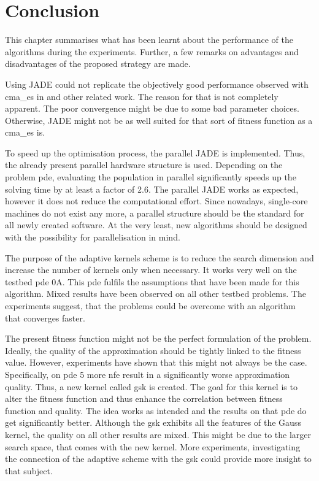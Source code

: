 \documentclass[./\jobname.tex]{subfiles}
\begin{document}
\chapter{Conclusion}
This chapter summarises what has been learnt about the performance of the algorithms during the experiments. Further, a few remarks on advantages and disadvantages of the proposed strategy are made. 

Using JADE could not replicate the objectively good performance observed with \gls{cma_es} in \cite{chaquet_using_2019} and other related work. The reason for that is not completely apparent. The poor convergence might be due to some bad parameter choices. Otherwise, JADE might not be as well suited for that sort of fitness function as a \gls{cma_es} is. 

To speed up the optimisation process, the parallel JADE is implemented. Thus, the already present parallel hardware structure is used. Depending on the problem \gls{pde}, evaluating the population in parallel significantly speeds up the solving time by at least a factor of 2.6. The parallel JADE works as expected, however it does not reduce the computational effort. Since nowadays, single-core machines do not exist any more, a parallel structure should be the standard for all newly created software. At the very least, new algorithms should be designed with the possibility for parallelisation in mind. 

The purpose of the adaptive kernels scheme is to reduce the search dimension and increase the number of kernels only when necessary. It works very well on the testbed \gls{pde} 0A. This \gls{pde} fulfils the assumptions that have been made for this algorithm. Mixed results have been observed on all other testbed problems. The experiments suggest, that the problems could be overcome with an algorithm that converges faster. 

The present fitness function might not be the perfect formulation of the problem. Ideally, the quality of the approximation should be tightly linked to the fitness value. However, experiments have shown that this might not always be the case. Specifically, on \gls{pde} 5 more \gls{nfe} result in a significantly worse approximation quality. Thus, a new kernel called \gls{gsk} is created. The goal for this kernel is to alter the fitness function and thus enhance the correlation between fitness function and quality. The idea works as intended and the results on that \gls{pde} do get significantly better. Although the \gls{gsk} exhibits all the features of the Gauss kernel, the quality on all other results are mixed. This might be due to the larger search space, that comes with the new kernel. More experiments, investigating the connection of the adaptive scheme with the \gls{gsk} could provide more insight to that subject.
\end{document}
